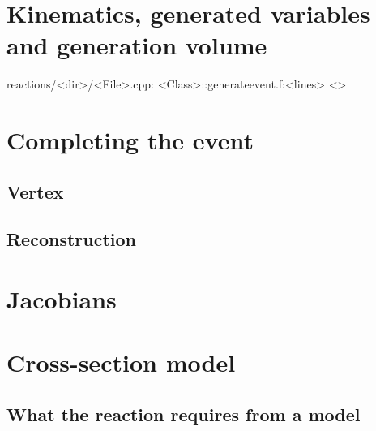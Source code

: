\section{Kinematics, generated variables and generation volume}
\begin{feq}{reactions/<dir>/<File>.cpp: <Class>::generate}{event.f:<lines>}
<>
\end{feq}

\section{Completing the event}
\subsection{Vertex}
\subsection{Reconstruction}

\section{Jacobians}

\section{Cross-section model}
\subsection{What the reaction requires from a model}
